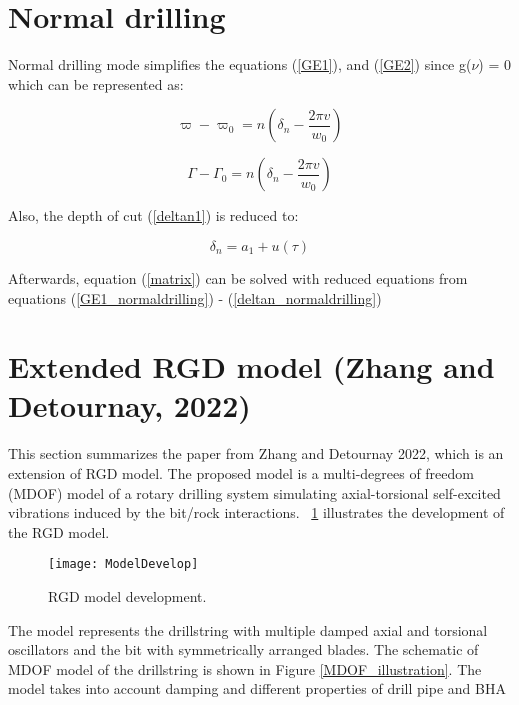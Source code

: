 \section{Normal drilling}
Normal drilling mode simplifies the equations (\ref{GE1}), and (\ref{GE2}) since g($\nu$) = 0 which can be represented as:

\begin{equation}\label{GE1_normaldrilling}
  \varpi-\varpi_0 = n\left(\delta_n - \frac{2\pi v}{w_0}\right)
\end{equation}

\begin{equation}\label{GE2_normaldrilling}
  \Gamma-\Gamma_0 = n\left(\delta_n - \frac{2\pi v}{w_0}\right)
\end{equation}

Also, the depth of cut (\ref{deltan1}) is reduced to:

\begin{equation}\label{deltan_normaldrilling}
  \delta_n = a_1 + u(\tau)
\end{equation}

Afterwards, equation (\ref{matrix}) can be solved with reduced equations from equations (\ref{GE1_normaldrilling}) - (\ref{deltan_normaldrilling})

\newpage
\section{Extended RGD model (Zhang and Detournay, 2022)}


This section summarizes the paper from Zhang and Detournay 2022, which is an extension of RGD model. The proposed model is a multi-degrees of freedom (MDOF) model of a rotary drilling system simulating axial-torsional self-excited vibrations induced by the bit/rock interactions. \figurename~\ref{model_develop_figure} illustrates the development of the RGD model.

\begin{figure}[ht]
  \centering
  \texttt{[image: ModelDevelop]}
  \caption[RGD model development]{RGD model development.}\label{model_develop_figure}
\end{figure}

The model represents the drillstring with multiple damped axial and torsional oscillators and the bit with symmetrically arranged blades. The schematic of MDOF model of the drillstring is shown in Figure \ref{MDOF_illustration}. The model takes into account damping and
different properties of drill pipe and BHA

